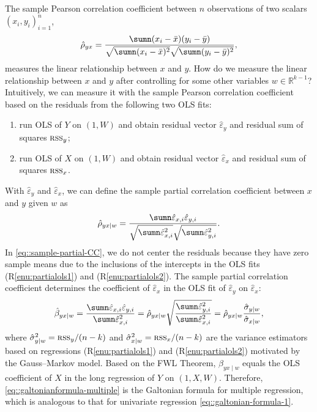 The sample Pearson correlation coefficient between $n$ observations of two
scalars $(x_{i},y_{i})_{i=1}^n $,
\[
 \hat{\rho}_ {yx}=\frac{\sumn(x_{i}-\bar{x})(y_{i}-\bar{y})}{\sqrt{\sumn(x_{i}-\bar{x})^{2}}\sqrt{\sumn(y_{i}-\bar{y})^{2}}},
\]
measures the linear relationship between $x$ and $y$. How do we
measure the linear relationship between $x$ and $y$ after controlling
for some other variables $w\in\mathbb{R}^{k-1}$? Intuitively, we
can measure it with the sample Pearson correlation coefficient based on the
residuals from the following two OLS fits:
\begin{enumerate}[label=(R\arabic*), ref=R\arabic*]
\item \label{enu:partialols1}run OLS of $Y$ on $(1,W)$ and obtain residual
vector $\hat{\varepsilon}_{y}$ and residual sum of squares $\textsc{rss}_{y}$;
\item \label{enu:partialols2}run OLS of $X$ on $(1,W)$ and obtain residual
vector $\hat{\varepsilon}_{x}$ and residual sum of squares $\textsc{rss}_{x}$.
\end{enumerate}
%
With $\hat{\varepsilon}_{y}$ and $\hat{\varepsilon}_{x}$, we can
define the sample partial correlation coefficient between $x$ and $y$ given
$w$ as 
\begin{equation}
\label{eq::sample-partial-CC}
 \hat{\rho}_ {yx\mid w}=\frac{\sumn\hat{\varepsilon}_{x,i}\hat{\varepsilon}_{y,i}}{\sqrt{\sumn\hat{\varepsilon}_{x,i}^{2}}\sqrt{\sumn\hat{\varepsilon}_{y,i}^{2}}}.
\end{equation}
 In \eqref{eq::sample-partial-CC}, we do not center the residuals because they
have zero sample means due to the inclusions of the intercepts in the
OLS fits (R\ref{enu:partialols1}) and (R\ref{enu:partialols2}). The sample partial correlation coefficient determines the coefficient of $\hat{\varepsilon}_{x}$ in the OLS fit  of $\hat{\varepsilon}_{y}$ on $\hat{\varepsilon}_{x}$:
\begin{eqnarray}
\label{eq::galtonianformula-multiple}
\hat{\beta}_{yx\mid w}=\frac{\sumn\hat{\varepsilon}_{x,i}\hat{\varepsilon}_{y,i}}{\sumn\hat{\varepsilon}_{x,i}^{2}}= \hat{\rho}_ {yx\mid w}\sqrt{\frac{\sumn\hat{\varepsilon}_{y,i}^{2}}{\sumn\hat{\varepsilon}_{x,i}^{2}}}= \hat{\rho}_ {yx\mid w}\frac{\hat{\sigma}_{y \mid  w}}{\hat{\sigma}_{x \mid  w}},
\end{eqnarray}
where $\hat{\sigma}_{y \mid  w}^{2}=\textsc{rss}_{y}/(n-k)$ and
$\hat{\sigma}_{x \mid  w}^{2}=\textsc{rss}_{x}/(n-k)$ are the
variance estimators based on regressions (R\ref{enu:partialols1}) and
(R\ref{enu:partialols2}) motivated by the Gauss--Markov model.  Based on the FWL Theorem, $\hat{\beta}_{yx\mid w}$
equals the OLS coefficient of $X$ in the long regression of $Y$
on $(1,X,W).$ Therefore,  \eqref{eq::galtonianformula-multiple} is the Galtonian formula for multiple regression, which is analogous to that for univariate regression \eqref{eq::galtonian-formula-1}. 

